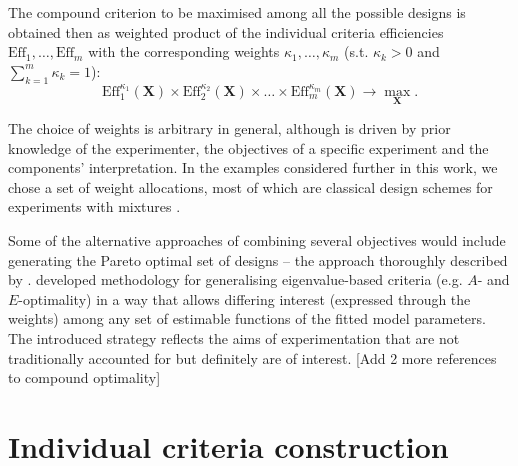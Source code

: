 \documentclass[11pt]{article}
\begin{document}
The compound criterion to be maximised among all the possible designs is obtained then as weighted product of the individual criteria efficiencies $\mbox{Eff}_{1},\ldots, \mbox{Eff}_{m}$ with the corresponding weights $\kappa_{1},\ldots ,\kappa_{m}$ (s.t. $\kappa_{k}>0$ and $\sum_{k=1}^{m}\kappa_{k}=1$):
\begin{equation}
\label{eq::compound}
\mbox{Eff}^{\kappa_{1}}_{1}(\bm{X})\times\mbox{Eff}^{\kappa_{2}}_{2}(\bm{X})\times\ldots\times\mbox{Eff}^{\kappa_{m}}_{m}(\bm{X})\rightarrow \underset{\bm{X}}\max.
\end{equation}

The choice of weights is arbitrary in general, although is driven by prior knowledge of the experimenter, the objectives of a specific experiment and the components' interpretation. In the examples considered further in this work, we chose a set of weight allocations, most of which are  classical design schemes for experiments with mixtures \citep{Cornell2011Mixtures}. 


Some of the alternative approaches of combining several objectives would include generating the Pareto optimal set of designs -- the approach thoroughly described by \cite{Lu2011optimization}.  \cite{Stallings2015general}developed methodology for generalising eigenvalue-based criteria (e.g. $A$- and $E$-optimality) in a way that allows differing interest (expressed through the weights) among any set of estimable functions of the fitted model parameters. The introduced strategy reflects the aims of experimentation that are not traditionally accounted for but definitely are of interest. [Add 2 more references to compound optimality]

\section{Individual criteria construction}
\label{sec::criteria}

\end{document}
